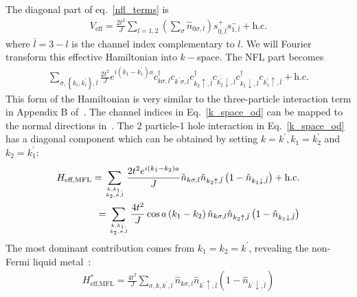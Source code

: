 \documentclass[reprint,prb,superscriptaddress]{revtex4-2}
\begin{document}
The diagonal part of eq.~\ref{nfl_terms} is
\begin{equation}\begin{aligned}
	V_\text{eff} = \frac{2t^2}{J}\sum_{l=1,2}\left(\sum_\sigma \hat n_{0\sigma,l}\right) s^+_{0,\bar l}s^-_{1,\bar l} + \text{h.c.}
\end{aligned}\end{equation}
where \(\bar l = 3 - l\) is the channel index complementary to \(l\). We will Fourier transform this effective Hamiltonian into \(k-\)space. The NFL part becomes
\begin{equation}\begin{aligned}
	\label{k_space_od}
	\sum_{\sigma, \left\{k_i,k_i^\prime\right\},l} \frac{2t^2}{J}e^{i\left(k_1 - k_1^\prime\right)a}c^\dagger_{k\sigma,l}c_{k^\prime\sigma,l}c^\dagger_{k_2 \uparrow, \bar l}c_{k_2^\prime \downarrow,\bar l}c^\dagger_{k_1 \downarrow,\bar l}c_{k_1^\prime \uparrow, \bar l} + \text{h.c.} 
\end{aligned}\end{equation}
This form of the Hamiltonian is very similar to the three-particle interaction term in Appendix B of~\cite{anirbanmott1}. The channel indices in Eq.~\ref{k_space_od} can be mapped to the normal directions in~\cite{anirbanmott1}. The 2 particle-1 hole interaction in Eq.~\ref{k_space_od} has a diagonal component which can be obtained by setting \(k=k^\prime, k_1 = k_2^\prime\) and \(k_2 = k_1^\prime\):
\begin{equation}\begin{aligned}
	H_\text{eff,MFL} = \sum_{k, k_1, \atop{k_2,\sigma,  l}} \frac{2t^2e^{i\left(k_1 - k_2\right)a}}{J} \hat n_{k\sigma,l} \hat n_{k_2 \uparrow, \bar l}\left(1 - \hat n_{k_1 \downarrow,\bar l}\right) + \text{h.c.}\\
	= \sum_{k, k_1, \atop{k_2,\sigma,  l}} \frac{4t^2}{J} \cos a\left(k_1 - k_2\right)  \hat n_{k\sigma,l} \hat n_{k_2 \uparrow, \bar l}\left(1 - \hat n_{k_1 \downarrow,\bar l}\right)
\end{aligned}\end{equation}
The most dominant contribution comes from \(k_1 = k_2 = k^\prime\), revealing the non-Fermi liquid metal~\cite{cox_jarrell_two_channel_rev,andrei_jerez_1995}:
\begin{equation}\begin{aligned}
	\label{mfl_large}
	H^*_\text{eff,MFL} = \frac{4t^2}{J} \sum_{\sigma, k, k^\prime, l} \hat n_{k\sigma,l} \hat n_{k^\prime \uparrow, \bar l}\left(1 - \hat n_{k^\prime \downarrow,\bar l}\right)
\end{aligned}\end{equation}
\end{document}
